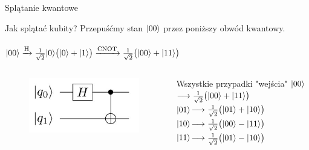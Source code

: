 \documentclass{beamer}
\DeclarePairedDelimiter\ket{\lvert}{\rangle}
\begin{document}
	\begin{frame}{Splątanie kwantowe}
		\begin{block}{Jak splątać kubity?}
			\vspace{0.5em}
			\centering
			Przepuśćmy stan $\ket{00}$ przez poniższy obwód kwantowy.\\~\\
			\centering
			$\ket{00}\xrightarrow{\text{H}}
			\frac{1}{\sqrt{2}}\ket{0}\big(\ket{0}+\ket{1} \big) 
			\xrightarrow{\text{CNOT}}
			\frac{1}{\sqrt{2}}\big(\ket{00} + \ket{11} \big)	
			$
			\vspace{0.8em}
		\end{block}
		\vspace{0.8em}
		\begin{columns}
			\begin{column}{0.5\textwidth}
				\begin{center}
					\begin{figure}[h]
					\includegraphics[left]{media/EPR_circuit.jpeg}
					\end{figure}
				\end{center}	
			\end{column}
			
			\begin{column}{0.5\textwidth}
				\begin{center}
				\begin{block}{Wszystkie przypadki "wejścia"}
					\vspace{0.5em}
					$\ket{00}$$\longrightarrow\frac{1}{\sqrt{2}}\big(\ket{00} + \ket{11} \big)$\\
					$\ket{01}$$\longrightarrow\frac{1}{\sqrt{2}}\big(\ket{01} + \ket{10} \big)$\\
					$\ket{10}$$\longrightarrow\frac{1}{\sqrt{2}}\big(\ket{00} - \ket{11} \big)$\\
					$\ket{11}$$\longrightarrow\frac{1}{\sqrt{2}}\big(\ket{01} - \ket{10} \big)$
					\vspace{0.5em}
				\end{block}
				\end{center}	
			\end{column}
		\end{columns}
	
	\end{frame}
	
\end{document}
